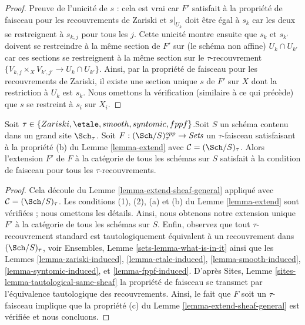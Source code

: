 \begin{proof}
\medskip\noindent
Preuve de l'unicité de $s$ : cela est vrai car $F'$ satisfait à la propriété de faisceau pour les recouvrements de Zariski et $s|_{U_k}$ doit être égal à $s_k$ car les deux se restreignent à $s_{k, j}$ pour tous les $j$. Cette unicité montre ensuite que $s_k$ et $s_{k'}$ doivent se restreindre à la même section de $F'$ sur (le schéma non affine) $U_k \cap U_{k'}$ car ces sections se restreignent à la même section sur le $\tau$-recouvrement $\{V_{k, j} \times_X V_{k', j'} \to U_k \cap U_{k'}\}$. Ainsi, par la propriété de faisceau pour les recouvrements de Zariski, il existe une section unique $s$ de $F'$ sur $X$ dont la restriction à $U_k$ est $s_k$. Nous omettons la vérification (similaire à ce qui précède) que $s$ se restreint à $s_i$ sur $X_i$.
\end{proof}

\begin{lemma}
\label{lemma-extend-sheaf}
Soit $\tau \in \{Zariski,\allowbreak \etale,\allowbreak smooth,\allowbreak syntomic,\allowbreak fppf\}$.\newline Soit $S$ un schéma contenu dans un grand site $\Sch_\tau$. Soit $F : (\Sch/S)_\tau^{opp} \to \textit{Sets}$ un $\tau$-faisceau satisfaisant à la propriété (b) du Lemme \ref{lemma-extend} avec $\mathcal{C} = (\Sch/S)_\tau$. Alors l'extension $F'$ de $F$ à la catégorie de tous les schémas sur $S$ satisfait à la condition de faisceau pour tous les $\tau$-recouvrements.
\end{lemma}

\begin{proof}
Cela découle du Lemme \ref{lemma-extend-sheaf-general} appliqué avec $\mathcal{C} = (\Sch/S)_\tau$. Les conditions (1), (2), (a) et (b) du Lemme \ref{lemma-extend} sont vérifiées ; nous omettons les détails. Ainsi, nous obtenons notre extension unique $F'$ à la catégorie de tous les schémas sur $S$. Enfin, observez que tout $\tau$-recouvrement standard est tautologiquement équivalent à un recouvrement dans $(\Sch/S)_\tau$, voir Ensembles, Lemme \ref{sets-lemma-what-is-in-it} ainsi que les Lemmes \ref{lemma-zariski-induced}, \ref{lemma-etale-induced}, \ref{lemma-smooth-induced}, \ref{lemma-syntomic-induced}, et \ref{lemma-fppf-induced}. D'après Sites, Lemme \ref{sites-lemma-tautological-same-sheaf} la propriété de faisceau se transmet par l'équivalence tautologique des recouvrements. Ainsi, le fait que $F$ soit un $\tau$-faisceau implique que la propriété (c) du Lemme \ref{lemma-extend-sheaf-general} est vérifiée et nous concluons.
\end{proof}











